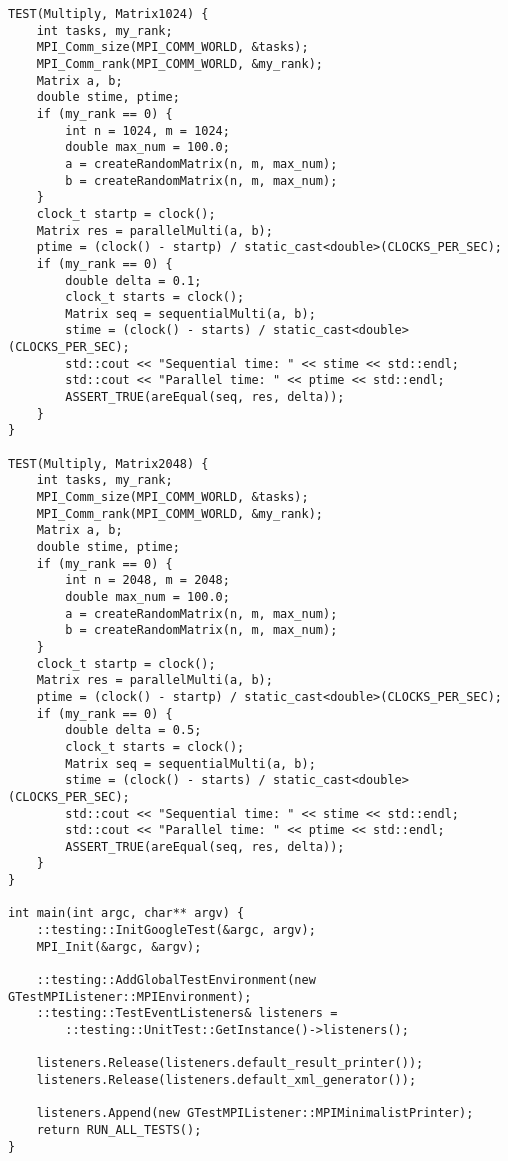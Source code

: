 \documentclass{report}
\begin{document}
\begin{lstlisting}
TEST(Multiply, Matrix1024) {
    int tasks, my_rank;
    MPI_Comm_size(MPI_COMM_WORLD, &tasks);
    MPI_Comm_rank(MPI_COMM_WORLD, &my_rank);
    Matrix a, b;
    double stime, ptime;
    if (my_rank == 0) {
        int n = 1024, m = 1024;
        double max_num = 100.0;
        a = createRandomMatrix(n, m, max_num);
        b = createRandomMatrix(n, m, max_num);
    }
    clock_t startp = clock();
    Matrix res = parallelMulti(a, b);
    ptime = (clock() - startp) / static_cast<double>(CLOCKS_PER_SEC);
    if (my_rank == 0) {
        double delta = 0.1;
        clock_t starts = clock();
        Matrix seq = sequentialMulti(a, b);
        stime = (clock() - starts) / static_cast<double>(CLOCKS_PER_SEC);
        std::cout << "Sequential time: " << stime << std::endl;
        std::cout << "Parallel time: " << ptime << std::endl;
        ASSERT_TRUE(areEqual(seq, res, delta));
    }
}

TEST(Multiply, Matrix2048) {
    int tasks, my_rank;
    MPI_Comm_size(MPI_COMM_WORLD, &tasks);
    MPI_Comm_rank(MPI_COMM_WORLD, &my_rank);
    Matrix a, b;
    double stime, ptime;
    if (my_rank == 0) {
        int n = 2048, m = 2048;
        double max_num = 100.0;
        a = createRandomMatrix(n, m, max_num);
        b = createRandomMatrix(n, m, max_num);
    }
    clock_t startp = clock();
    Matrix res = parallelMulti(a, b);
    ptime = (clock() - startp) / static_cast<double>(CLOCKS_PER_SEC);
    if (my_rank == 0) {
        double delta = 0.5;
        clock_t starts = clock();
        Matrix seq = sequentialMulti(a, b);
        stime = (clock() - starts) / static_cast<double>(CLOCKS_PER_SEC);
        std::cout << "Sequential time: " << stime << std::endl;
        std::cout << "Parallel time: " << ptime << std::endl;
        ASSERT_TRUE(areEqual(seq, res, delta));
    }
}

int main(int argc, char** argv) {
    ::testing::InitGoogleTest(&argc, argv);
    MPI_Init(&argc, &argv);

    ::testing::AddGlobalTestEnvironment(new GTestMPIListener::MPIEnvironment);
    ::testing::TestEventListeners& listeners =
        ::testing::UnitTest::GetInstance()->listeners();

    listeners.Release(listeners.default_result_printer());
    listeners.Release(listeners.default_xml_generator());

    listeners.Append(new GTestMPIListener::MPIMinimalistPrinter);
    return RUN_ALL_TESTS();
}
\end{lstlisting}
\end{document}
